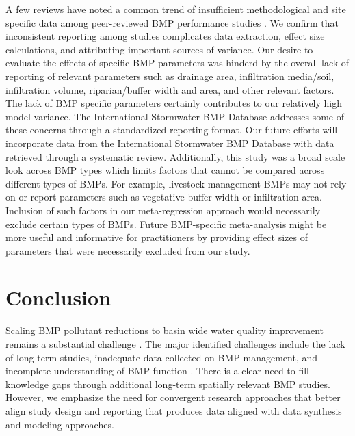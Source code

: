 \documentclass[utf8]{FrontiersinHarvard}
\begin{document}
A few reviews have noted a common trend of insufficient methodological and site specific data among peer-reviewed BMP performance studies \citep{grudzinskiDoesRiparianFencing2020, eagleMetaAnalysisConstrained2017, liuReviewEffectivenessBest2017}.
We confirm that inconsistent reporting among studies complicates data extraction, effect size calculations, and attributing important sources of variance.
Our desire to evaluate the effects of specific BMP parameters was hinderd by the overall lack of reporting of relevant parameters such as drainage area, infiltration media/soil, infiltration volume, riparian/buffer width and area, and other relevant factors.
The lack of BMP specific parameters certainly contributes to our relatively high model variance.
The International Stormwater BMP Database addresses some of these concerns through a standardized reporting format.
Our future efforts will incorporate data from the International Stormwater BMP Database with data retrieved through a systematic review.
Additionally, this study was a broad scale look across BMP types which limits factors that cannot be compared across different types of BMPs.
For example, livestock management BMPs may not rely on or report parameters such as vegetative buffer width or infiltration area.
Inclusion of such factors in our meta-regression approach would necessarily exclude certain types of BMPs.
Future BMP-specific meta-analysis might be more useful and informative for practitioners by providing effect sizes of parameters that were necessarily excluded from our study.

\hypertarget{conclusion}{%
\section{Conclusion}\label{conclusion}}

Scaling BMP pollutant reductions to basin wide water quality improvement remains a substantial challenge \citep{tomerChallengeDocumentingWater2011, mellandEffectsAgriculturalLand2018, mealsLagTimeWater2010}.
The major identified challenges include the lack of long term studies, inadequate data collected on BMP management, and incomplete understanding of BMP function \citep{linternBestManagementPractices2020, liuReviewEffectivenessBest2017}.
There is a clear need to fill knowledge gaps through additional long-term spatially relevant BMP studies.
However, we emphasize the need for convergent research approaches that better align study design and reporting that produces data aligned with data synthesis and modeling approaches.
\end{document}

